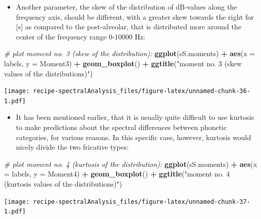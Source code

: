 \documentclass[]{book}
\newenvironment{Shaded}{\begin{snugshade}}{\end{snugshade}}
\newcommand{\CommentTok}[1]{\textcolor[rgb]{0.56,0.35,0.01}{\textit{#1}}}
\newcommand{\DataTypeTok}[1]{\textcolor[rgb]{0.13,0.29,0.53}{#1}}
\newcommand{\KeywordTok}[1]{\textcolor[rgb]{0.13,0.29,0.53}{\textbf{#1}}}
\newcommand{\NormalTok}[1]{#1}
\newcommand{\OperatorTok}[1]{\textcolor[rgb]{0.81,0.36,0.00}{\textbf{#1}}}
\newcommand{\StringTok}[1]{\textcolor[rgb]{0.31,0.60,0.02}{#1}}
\providecommand{\tightlist}{%
  \setlength{\itemsep}{0pt}\setlength{\parskip}{0pt}}
\begin{document}
\begin{itemize}
\tightlist
\item
  Another parameter, the skew of the distribution of dB-values along the frequency axis, should be different, with a greater skew towards the right for {[}s{]} as compared to the post-alveolar, that is distributed more around the center of the frequency range 0-10000 Hz:
\end{itemize}

\begin{Shaded}
\begin{Highlighting}[]
\CommentTok{# plot moment no. 3 (skew of the distribution):}
\KeywordTok{ggplot}\NormalTok{(sS.moments) }\OperatorTok{+}
\StringTok{  }\KeywordTok{aes}\NormalTok{(}\DataTypeTok{x =}\NormalTok{ labels, }\DataTypeTok{y =}\NormalTok{ Moment3) }\OperatorTok{+}
\StringTok{  }\KeywordTok{geom_boxplot}\NormalTok{() }\OperatorTok{+}
\StringTok{  }\KeywordTok{ggtitle}\NormalTok{(}\StringTok{"moment no. 3 (skew values of the distributions)"}\NormalTok{)}
\end{Highlighting}
\end{Shaded}

\texttt{[image: recipe-spectralAnalysis\_files/figure-latex/unnamed-chunk-36-1.pdf]}

\begin{itemize}
\tightlist
\item
  It has been mentioned earlier, that it is usually quite difficult to use kurtosis to make predictions about the spectral differences between phonetic categories, for various reasons. In this specific case, however, kurtosis would nicely divide the two fricative types:
\end{itemize}

\begin{Shaded}
\begin{Highlighting}[]
\CommentTok{# plot moment no. 4 (kurtosis of the distribution):}
\KeywordTok{ggplot}\NormalTok{(sS.moments) }\OperatorTok{+}
\StringTok{  }\KeywordTok{aes}\NormalTok{(}\DataTypeTok{x =}\NormalTok{ labels, }\DataTypeTok{y =}\NormalTok{ Moment4) }\OperatorTok{+}
\StringTok{  }\KeywordTok{geom_boxplot}\NormalTok{() }\OperatorTok{+}
\StringTok{  }\KeywordTok{ggtitle}\NormalTok{(}\StringTok{"moment no. 4 (kurtosis values of the distributions)"}\NormalTok{)}
\end{Highlighting}
\end{Shaded}

\texttt{[image: recipe-spectralAnalysis\_files/figure-latex/unnamed-chunk-37-1.pdf]}
\end{document}
